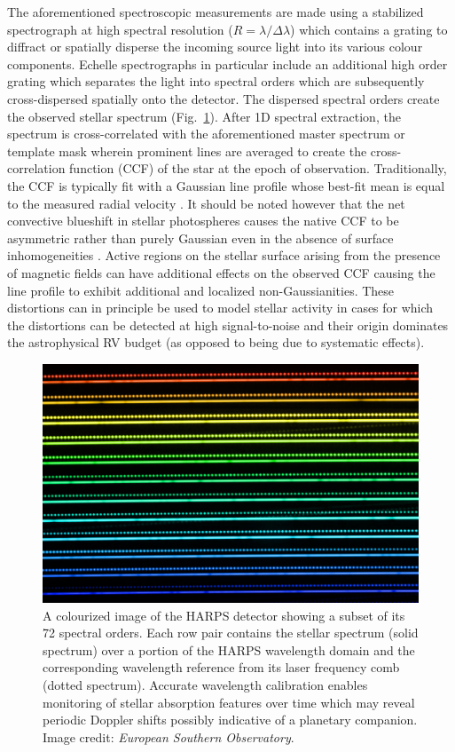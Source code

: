 The aforementioned
spectroscopic measurements are made using a stabilized spectrograph at high spectral resolution
($R=\lambda / \Delta \lambda$) which contains a grating to 
diffract or spatially disperse the incoming source light into its various colour components.
Echelle spectrographs in particular include an additional high order grating which separates the
light into spectral orders which are subsequently cross-dispersed spatially onto the detector. The
dispersed spectral orders create the observed stellar spectrum (Fig.~\ref{fig:harps}).
After 1D spectral extraction, the spectrum is cross-correlated with the aforementioned master spectrum
or template mask wherein prominent lines 
are averaged to create the cross-correlation function (CCF) of the star at the epoch of 
observation. Traditionally, the CCF is typically fit with a Gaussian line profile whose best-fit mean 
is equal to the measured radial velocity \citep{pepe02}. It should be noted however that the net
convective blueshift in stellar photospheres causes the native CCF to be asymmetric rather
than purely Gaussian even in the absence of surface inhomogeneities \citep{gray89}.
Active regions on the stellar surface arising 
from the presence of magnetic fields can have additional effects on the observed CCF 
causing the line profile to exhibit additional and localized non-Gaussianities. 
These distortions can in principle be used to model stellar activity in cases for which the distortions
can be detected at high signal-to-noise and their origin dominates the astrophysical RV budget (as opposed
to being due to systematic effects). \\

\begin{figure}
  \centering
  \includegraphics[width=0.8\hsize]{figures/20140904_harps-lasercomb.jpg}
  \caption[Image of spectral orders from the HARPS echelle spectrograph.]
      {A colourized image of the HARPS detector showing a subset of its 72 spectral orders.
    Each row pair contains the stellar spectrum (solid spectrum) over a portion of the HARPS wavelength
    domain and the corresponding wavelength reference from its laser frequency comb (dotted spectrum).
    Accurate wavelength calibration enables monitoring of stellar absorption features over time which
    may reveal periodic Doppler shifts possibly indicative of a planetary companion.
    Image credit: \emph{European Southern Observatory}.}
  \label{fig:harps}
\end{figure}


